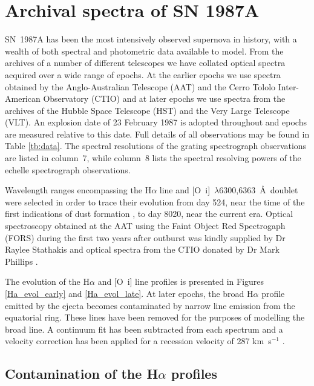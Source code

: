 \documentclass[useAMS,usenatbib,usegraphicx]{mnras}
\begin{document}
\section{Archival spectra of SN 1987A}
\label{spectra}

SN~1987A has been the most intensively observed supernova in history, with 
a wealth of both spectral and photometric data available to model.  From 
the archives of a number of different telescopes we have collated optical 
spectra acquired over a wide range of epochs.  At the earlier epochs we 
use spectra obtained by the Anglo-Australian Telescope (AAT) and the Cerro 
Tololo Inter-American Observatory (CTIO) and at later epochs we 
use spectra from the archives of the Hubble Space Telescope (HST) and the Very 
Large Telescope (VLT).  An explosion date of 23 February 1987 is adopted 
throughout and epochs are measured relative to this date.  Full details of 
all observations may be found in Table \ref{tb:data}. The spectral 
resolutions of the grating spectrograph observations are listed in 
column~7, while column~8 lists the spectral resolving powers of the 
echelle spectrograph observations.

Wavelength ranges encompassing the H$\alpha$ line and [O~{\sc i}]~$\lambda$6300,6363~\AA\ doublet were selected in order to trace their 
evolution from day 524, near the time of the first indications of dust 
formation \citep{Wooden1993}, to day 8020, near the current era. Optical 
spectroscopy obtained at the AAT using the Faint Object Red Spectrogaph 
(FORS) during the first two years after outburst was kindly supplied by Dr Raylee 
Stathakis \citep{Spyromilio1991, Spyromilio1993, Hanuschik1993} and optical spectra from the CTIO donated by Dr Mark Phillips \citep{Suntzeff1991}.




The evolution of the H$\alpha$ and [O~{\sc i}] line profiles is presented in Figures 
\ref{Ha_evol_early} and \ref{Ha_evol_late}.  At later epochs, the broad H$\alpha$ profile emitted by the ejecta becomes contaminated by narrow line emission 
from the equatorial ring.  These lines have been removed for the purposes 
of modelling the broad line. A continuum fit has been subtracted from each 
spectrum and a velocity correction has been applied for a recession 
velocity of 287 km~s$^{-1}$ \citep{Groningsson2008}.

\subsection{Contamination of the H$\alpha$ profiles}
\end{document}
